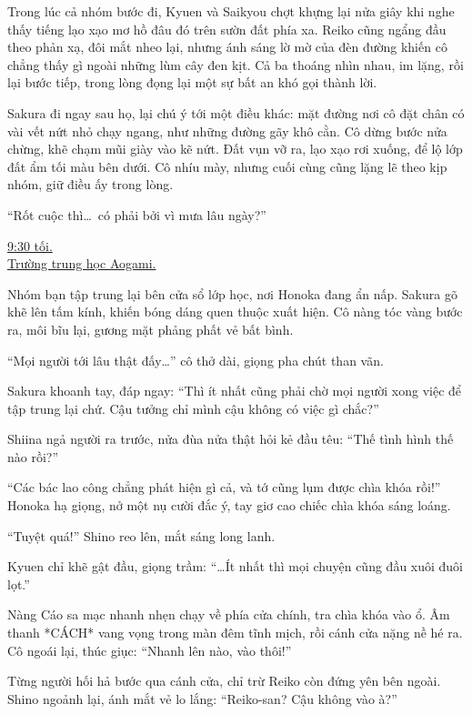 \documentclass[../main.tex]{subfiles}
\begin{document}
Trong lúc cả nhóm bước đi, Kyuen và Saikyou chợt khựng lại nửa giây khi nghe thấy tiếng lạo xạo mơ hồ đâu đó trên sườn đất phía xa. Reiko cũng ngẩng đầu theo phản xạ, đôi mắt nheo lại, nhưng ánh sáng lờ mờ của đèn đường khiến cô chẳng thấy gì ngoài những lùm cây đen kịt. Cả ba thoáng nhìn nhau, im lặng, rồi lại bước tiếp, trong lòng đọng lại một sự bất an khó gọi thành lời.

Sakura đi ngay sau họ, lại chú ý tới một điều khác: mặt đường nơi cô đặt chân có vài vết nứt nhỏ chạy ngang, như những đường gãy khô cằn. Cô dừng bước nửa chừng, khẽ chạm mũi giày vào kẽ nứt. Đất vụn vỡ ra, lạo xạo rơi xuống, để lộ lớp đất ẩm tối màu bên dưới. Cô nhíu mày, nhưng cuối cùng cũng lặng lẽ theo kịp nhóm, giữ điều ấy trong lòng.

``Rốt cuộc thì\dots\ có phải bởi vì mưa lâu ngày?''

\begin{center}
  \uline{9:30 tối.\\Trường trung học Aogami.}
\end{center}

Nhóm bạn tập trung lại bên cửa sổ lớp học, nơi Honoka đang ẩn nấp. Sakura gõ khẽ lên tấm kính, khiến bóng dáng quen thuộc xuất hiện. Cô nàng tóc vàng bước ra, môi bĩu lại, gương mặt phảng phất vẻ bất bình.

``Mọi người tới lâu thật đấy\dots'' cô thở dài, giọng pha chút than vãn.


Sakura khoanh tay, đáp ngay: ``Thì ít nhất cũng phải chờ mọi người xong việc để tập trung lại chứ. Cậu tưởng chỉ mình cậu không có việc gì chắc?''

Shiina ngả người ra trước, nửa đùa nửa thật hỏi kẻ đầu têu: ``Thế tình hình thế nào rồi?''

``Các bác lao công chẳng phát hiện gì cả, và tớ cũng lụm được chìa khóa rồi!'' Honoka hạ giọng, nở một nụ cười đắc ý, tay giơ cao chiếc chìa khóa sáng loáng.

``Tuyệt quá!'' Shino reo lên, mắt sáng long lanh.

Kyuen chỉ khẽ gật đầu, giọng trầm: ``\dots Ít nhất thì mọi chuyện cũng đầu xuôi đuôi lọt.''

Nàng Cáo sa mạc nhanh nhẹn chạy về phía cửa chính, tra chìa khóa vào ổ. Âm thanh *CÁCH* vang vọng trong màn đêm tĩnh mịch, rồi cánh cửa nặng nề hé ra. Cô ngoái lại, thúc giục: ``Nhanh lên nào, vào thôi!''

Từng người hối hả bước qua cánh cửa, chỉ trừ Reiko còn đứng yên bên ngoài. Shino ngoảnh lại, ánh mắt vẻ lo lắng: ``Reiko-san? Cậu không vào à?''
\end{document}
